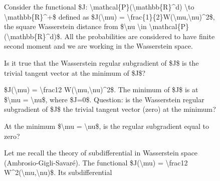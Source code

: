 \begin{figure}[t]
\centering
\setlength{\columnsep}{12pt}
\setlength{\colw}{\dimexpr(\linewidth-2\columnsep)/3\relax}
\begin{promptrow}
\caret{}\par\vspace{4pt}
Consider the functional \$J: \textbackslash{}mathcal\{P\}(\textbackslash{}mathbb\{R\}\textasciicircum{}d) \textbackslash{}to \textbackslash{}mathbb\{R\}\textasciicircum{}+\$ defined as \$J(\textbackslash{}mu) = \textbackslash{}frac\{1\}\{2\}W(\textbackslash{}mu,\textbackslash{}nu)\textasciicircum{}2\$, the square Wasserstein distance from \$\textbackslash{}nu \textbackslash{}in \textbackslash{}mathcal\{P\}(\textbackslash{}mathbb\{R\}\textasciicircum{}d)\$. All the probabilities are considered to have finite second moment and we are working in the Wasserstein space.\par
  Is it true that the Wasserstein regular subgradient of \$J\$ is the trivial tangent vector at the minimum of \$J\$?
\par\vspace{6pt}
{}\par\vspace{3pt}
{\monofont\footnotesize {}}
\end{promptrow}\par
\vspace{12pt}
\noindent
\begin{reasoncol}[equal height group=reasX3]
  \par\vspace{1pt}
  \caret{}\par\vspace{4pt}
  \raggedright {} \$J(\textbackslash{}mu) = \textbackslash{}frac12 W(\textbackslash{}mu,\textbackslash{}nu)\textasciicircum{}2\$. The minimum of \$J\$ is at \$\textbackslash{}mu = \textbackslash{}nu\$, where \$J=0\$. Question: is the Wasserstein regular subgradient of \$J\$ the trivial tangent vector (zero) at the minimum?\par
  At the minimum \$\textbackslash{}mu = \textbackslash{}nu\$, is the regular subgradient equal to zero?\par
  Let me recall the theory of subdifferential in Wasserstein space (Ambrosio-Gigli-Savaré). The functional \$J(\textbackslash{}mu) = \textbackslash{}frac12 W\textasciicircum{}2(\textbackslash{}mu,\textbackslash{}nu)\$. Its subdifferential\par\vspace{3pt}\elide

\end{reasoncol}
\end{figure}
